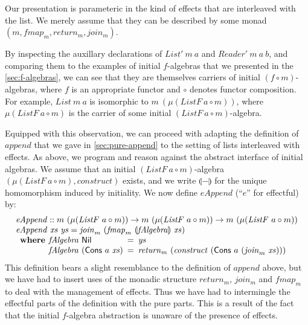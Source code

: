 \documentclass{jfp1}
\newcommand{\fold}[1]{\llparenthesis #1 \rrparenthesis}
\begin{document}
Our presentation is parameteric in the kind of effects that
are interleaved with the list. We merely assume that they can be
described by some monad $(m, \mathit{fmap_m}, \mathit{return_m},
\mathit{join_m})$.

By inspecting the auxillary declarations of $\mathit{List'}~m~a$ and
$\mathit{Reader'}~m~a~b$, and comparing them to the examples of
initial $f$-algebras that we presented in the
\autoref{sec:f-algebras}, we can see that they are themselves carriers
of initial $(f \circ m)$-algebras, where $f$ is an appropriate functor
and $\circ$ denotes functor composition. For example,
$\mathit{List}~m~a$ is isomorphic to $m~(\mu (\mathit{ListF}~a \circ
m))$, where $\mu (\mathit{ListF}~a \circ m)$ is the carrier of some
initial $(\mathit{ListF}~a \circ m)$-algebra.

Equipped with this observation, we can proceed with adapting the
definition of $\mathit{append}$ that we gave in
\autoref{sec:pure-append} to the setting of lists interleaved with
effects. As above, we program and reason against the abstract
interface of initial algebras. We assume that an initial
$(\mathit{ListF}~a \circ m)$-algebra $(\mu(\mathit{ListF}~a \circ m),
\mathit{construct})$ exists, and we write $\fold{-}$ for the unique
homomorphism induced by initiality. We now define $\mathit{eAppend}$
(``$\mathit{e}$'' for effectful) by:
\begin{displaymath}
  \begin{array}{l}
    \mathit{eAppend} :: m~(\mu (\mathit{ListF}~a \circ m)) \to m~(\mu (\mathit{ListF}~a \circ m)) \to m~(\mu (\mathit{ListF}~a \circ m)) \\
    \mathit{eAppend}~\mathit{xs}~\mathit{ys} = \mathit{join}_m~(\mathit{fmap}_m~\fold{\mathit{fAlgebra}}~\mathit{xs}) \\
    \begin{array}{r@{\hspace{0.4em}}l@{\hspace{0.5em}}c@{\hspace{0.5em}}l}
      \textbf{where} & \mathit{fAlgebra}~\mathsf{Nil} &=& \mathit{ys} \\
                     & \mathit{fAlgebra}~(\mathsf{Cons}~a~\mathit{xs}) &=& \mathit{return}_m~(\mathit{construct}~(\mathsf{Cons}~a~(\mathit{join}_m~\mathit{xs})))
    \end{array}
  \end{array}
\end{displaymath}
This definition bears a slight resemblance to the definition of
$\mathit{append}$ above, but we have had to insert uses of the monadic
structure $\mathit{return_m}$, $\mathit{join_m}$ and $\mathit{fmap_m}$
to deal with the management of effects. Thus we have had to
intermingle the effectful parts of the definition with the pure
parts. This is a result of the fact that the initial $f$-algebra
abstraction is unaware of the presence of effects.
\end{document}
